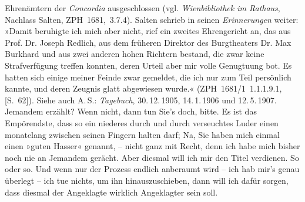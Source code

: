 {{{                  Ehrenämtern der \emph{Concordia} ausgeschlossen
                     (vgl. \emph{Wienbibliothek im Rathaus}, Nachlass Salten, ZPH 1681, 3.7.4). Salten schrieb in seinen \emph{Erinnerungen} weiter: »Damit beruhigte ich mich
                     aber nicht, rief ein zweites Ehrengericht an, das aus Prof. Dr. Joseph Redlich, aus dem früheren Direktor
                     des Burgtheaters Dr. Max Burkhard und aus zwei anderen hohen Richtern
                     bestand, die zwar keine Strafverfügung treffen konnten, deren Urteil aber mir
                     volle Genugtuung bot. Es hatten sich einige meiner Feinde zwar gemeldet, die
                     ich nur zum Teil persönlich kannte, und deren Zeugnis glatt abgewiesen
                     wurde.« (ZPH 1681/1 1.1.1.9.1, [S. 62]). Siehe auch A. S.: \emph{Tagebuch}, 30. 12. 1905, 14. 1. 1906 und 12. 5. 1907.}}}\label{K_L03415-6}
               Jemandem erzählt? Wenn nicht, dann tun Sie’s doch, bitte. Es ist das Empörendste,
               dass so ein niederes {\pb}durch und
               durch verseuchtes Luder einen monatelang zwischen seinen Fingern halten darf; Na, Sie
               haben mich einmal einen »guten Hasser« genannt, – nicht ganz mit Recht, denn ich habe
               mich bisher noch nie an Jemandem gerächt. Aber diesmal will ich mir den Titel
               verdienen. So oder so. Und wenn nur der Prozess endlich anberaumt wird – ich hab
               mir’s genau überlegt – ich tue nichts, um ihn hinauszuschieben, dann will ich dafür
               sorgen, dass diesmal der Angeklagte wirklich Angeklagter sein soll.\pend
           
